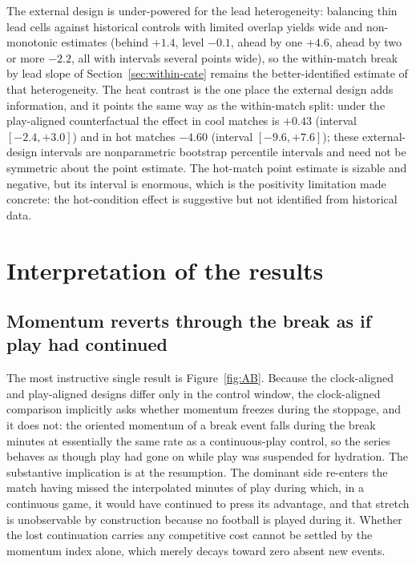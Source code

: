 \documentclass[11pt]{article}
\begin{document}
The external design is under-powered for the lead heterogeneity: balancing thin lead cells against historical
controls with limited overlap yields wide and non-monotonic estimates (behind $+1.4$, level $-0.1$, ahead by
one $+4.6$, ahead by two or more $-2.2$, all with intervals several points wide), so the within-match break by
lead slope of Section~\ref{sec:within-cate} remains the better-identified estimate of that heterogeneity. The
heat contrast is the one place the external design adds information, and it points the same way as the
within-match split: under the play-aligned counterfactual the effect in cool matches is $+0.43$
(interval $[-2.4,+3.0]$) and in hot matches $-4.60$ (interval $[-9.6,+7.6]$); these external-design intervals
are nonparametric bootstrap percentile intervals and need not be symmetric about the point estimate. The
hot-match point estimate is sizable and negative, but its interval is enormous, which is the positivity
limitation made concrete: the hot-condition effect is suggestive but not identified from historical data.

\section{Interpretation of the results}
\label{sec:discussion}

\subsection{Momentum reverts through the break as if play had continued}

The most instructive single result is Figure~\ref{fig:AB}. Because the clock-aligned and play-aligned
designs differ only in the control window, the clock-aligned comparison implicitly asks whether momentum
freezes during the stoppage, and it does not: the oriented momentum of a break event falls during the break
minutes at essentially the same rate as a continuous-play control, so the series behaves as though play had
gone on while play was suspended for hydration. The substantive implication is at the resumption. The dominant side re-enters
the match having missed the interpolated minutes of play during which, in a continuous game, it would have
continued to press its advantage, and that stretch is unobservable by construction because no football is
played during it. Whether the lost continuation carries any competitive cost cannot be settled by the momentum
index alone, which merely decays toward zero absent new events.
\end{document}
